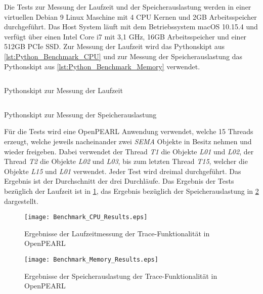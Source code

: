 Die Tests zur Messung der Laufzeit und der Speicherauslastung werden in einer
virtuellen Debian 9 Linux Maschine mit 4 CPU Kernen und 2GB Arbeitsspeicher
durchgeführt. Das Host System läuft mit dem Betriebssystem macOS 10.15.4 und
verfügt über einen Intel Core i7 mit 3,1 GHz, 16GB Arbeitsspeicher und einer
512GB PCIe SSD. Zur Messung der Laufzeit wird das Pythonskipt aus
\cref{lst:Python_Benchmark_CPU} und zur Messung der Speicherauslastung das
Pythonskipt aus \cref{lst:Python_Benchmark_Memory} verwendet.
\begin{listing}[ht]
  \inputminted[frame=lines,linenos]{python}{./Python/benchmark_cpu.py}
  \caption{Pythonskipt zur Messung der Laufzeit}
  \label{lst:Python_Benchmark_CPU}   
\end{listing} 
\begin{listing}[ht]
  \inputminted[frame=lines,linenos]{python}{./Python/benchmark_memory.py}
  \caption{Pythonskipt zur Messung der Speicherauslastung}
  \label{lst:Python_Benchmark_Memory}   
\end{listing}
Für die Tests wird eine OpenPEARL Anwendung verwendet, welche 15 Threads
erzeugt, welche jeweils nacheinander zwei \textit{SEMA} Objekte in Besitz nehmen
und wieder freigeben. Dabei verwendet der Thread \textit{T1} die Objekte
\textit{L01} und \textit{L02}, der Thread \textit{T2} die Objekte \textit{L02}
und \textit{L03}, bis zum letzten Thread \textit{T15}, welcher die Objekte
\textit{L15} und \textit{L01} verwendet. Jeder Test wird dreimal durchgeführt.
Das Ergebnis ist der Durchschnitt der drei Durchläufe. Das Ergebnis der Tests
bezüglich der Laufzeit ist in \cref{fig:BenchmarkCpuResults}, das Ergebnis
bezüglich der Speicherauslastung in \cref{fig:BenchmarkMemoryResults}
dargestellt.
\begin{figure}[ht]
  \texttt{[image: Benchmark\_CPU\_Results.eps]}
  \caption{Ergebnisse der Laufzeitmessung der Trace-Funktionalität in OpenPEARL}
  \label{fig:BenchmarkCpuResults}
\end{figure}

\begin{figure}[ht]
  \texttt{[image: Benchmark\_Memory\_Results.eps]}
  \caption{Ergebnisse der Speicherauslastung der Trace-Funktionalität in OpenPEARL}
  \label{fig:BenchmarkMemoryResults}
\end{figure}

